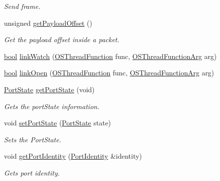 \begin{DoxyCompactItemize}
\begin{DoxyCompactList}\small\item\em Send frame. \end{DoxyCompactList}\item 
unsigned \hyperlink{class_common_port_a2697fd0fc7139659877b76cd1b022d44}{get\+Payload\+Offset} ()
\begin{DoxyCompactList}\small\item\em Get the payload offset inside a packet. \end{DoxyCompactList}\item 
\hyperlink{avb__gptp_8h_af6a258d8f3ee5206d682d799316314b1}{bool} \hyperlink{class_common_port_a2e924d1664a7395f8f7afb21107e0f21}{link\+Watch} (\hyperlink{avbts__osthread_8hpp_a68966f4aba46c269e8341073e7787d34}{O\+S\+Thread\+Function} func, \hyperlink{avbts__osthread_8hpp_af08b3560013183b63aff5fe8243818d1}{O\+S\+Thread\+Function\+Arg} arg)
\item 
\hyperlink{avb__gptp_8h_af6a258d8f3ee5206d682d799316314b1}{bool} \hyperlink{class_common_port_a60db54b7cb6a6f7b526ea23fb73eefcf}{link\+Open} (\hyperlink{avbts__osthread_8hpp_a68966f4aba46c269e8341073e7787d34}{O\+S\+Thread\+Function} func, \hyperlink{avbts__osthread_8hpp_af08b3560013183b63aff5fe8243818d1}{O\+S\+Thread\+Function\+Arg} arg)
\item 
\hyperlink{ptptypes_8hpp_a679431f1afc75d7bb9e972c022e53672}{Port\+State} \hyperlink{class_common_port_aa4182d914fdb9a27fb875d8495e0289c}{get\+Port\+State} (void)
\begin{DoxyCompactList}\small\item\em Gets the port\+State information. \end{DoxyCompactList}\item 
void \hyperlink{class_common_port_a8e4a7a3f199cde3540ed0d1ab10386e5}{set\+Port\+State} (\hyperlink{ptptypes_8hpp_a679431f1afc75d7bb9e972c022e53672}{Port\+State} state)
\begin{DoxyCompactList}\small\item\em Sets the Port\+State. \end{DoxyCompactList}\item 
void \hyperlink{class_common_port_a563117781330d95f1c6aa43837b7e4ed}{get\+Port\+Identity} (\hyperlink{class_port_identity}{Port\+Identity} \&identity)
\begin{DoxyCompactList}\small\item\em Gets port identity. \end{DoxyCompactList}\item 

\end{DoxyCompactItemize}
